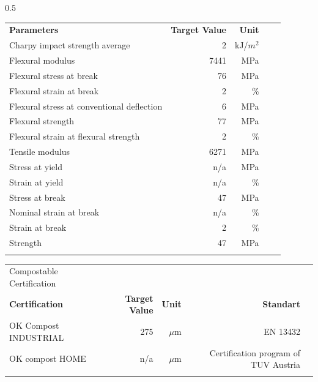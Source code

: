 \documentclass{article}
\begin{document}
\begin{center}
\begin{paracol}{2}
\begin{tabularx}{0.5\textwidth}
\end{tabularx}\switchcolumn\begin{tabularx}{0.5\textwidth}
{X r  r  r  r }\textbf{Parameters} & \textbf{Target Value} & \textbf{Unit} &  &  \\
Charpy impact strength average & 2 & kJ/\(m^2\) &  &  \\
\arrayrulecolor{line_color}\hline
Flexural modulus & 7441 & MPa &  &  \\
\arrayrulecolor{line_color}\hline
Flexural stress at break & 76 & MPa &  &  \\
\arrayrulecolor{line_color}\hline
Flexural strain at break & 2 & \% &  &  \\
\arrayrulecolor{line_color}\hline
Flexural stress at conventional deflection & 6 & MPa &  &  \\
\arrayrulecolor{line_color}\hline
Flexural strength & 77 & MPa &  &  \\
\arrayrulecolor{line_color}\hline
Flexural strain at flexural strength & 2 & \% &  &  \\
\arrayrulecolor{line_color}\hline
Tensile modulus & 6271 & MPa &  &  \\
\arrayrulecolor{line_color}\hline
Stress at yield & n/a & MPa &  &  \\
\arrayrulecolor{line_color}\hline
Strain at yield & n/a & \% &  &  \\
\arrayrulecolor{line_color}\hline
Stress at break & 47 & MPa &  &  \\
\arrayrulecolor{line_color}\hline
Nominal strain at break & n/a & \% &  &  \\
\arrayrulecolor{line_color}\hline
Strain at break & 2 & \% &  &  \\
\arrayrulecolor{line_color}\hline
Strength & 47 & MPa &  &  \\
\arrayrulecolor{line_color}\hline

\end{tabularx}
\end{paracol}
\end{center}
\begin{center}
\begin{tabularx}
{\textwidth}{X r  r  r  r }\rowcolor{color_title}Compostable Certification &  &  &  &  \\
\textbf{Certification} & \textbf{Target Value} & \textbf{Unit} & \textbf{Standart} &  \\
OK Compost INDUSTRIAL & 275 & \(\mu\)m & EN 13432 &  \\
\arrayrulecolor{line_color}\hline
OK compost HOME & n/a & \(\mu\)m & Certification program of TUV Austria &  \\
\arrayrulecolor{line_color}\hline

\end{tabularx}
\end{center}
\end{document}

